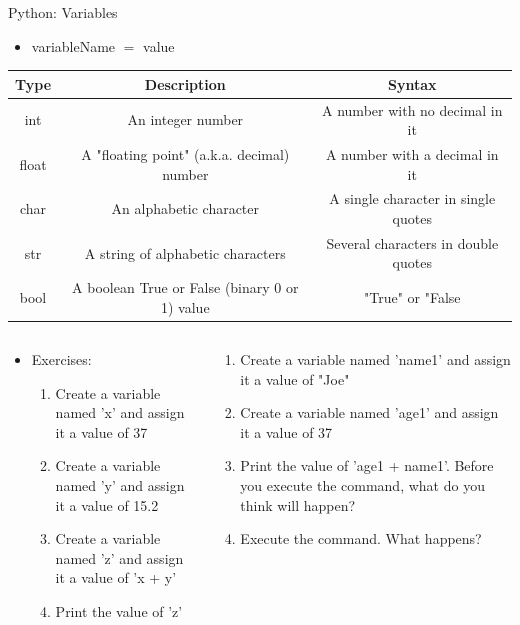 \documentclass[10pt, aspectratio=169]{beamer}
\begin{document}
\begin{frame}{Python: Variables}
    \begin{itemize}
        \item variableName $=$ value
    \end{itemize}

    \begin{center}
        \begin{tabular}{|c||c|c|}
            \hline
            Type & Description & Syntax \\
            \hline \hline
            int & An integer number & A number with no decimal in it\\
            \hline
            float & A "floating point" (a.k.a. decimal) number & A number with a decimal in it \\
            \hline
            char & An alphabetic character & A single character in single quotes\\
            \hline
            str & A string of alphabetic characters & Several characters in double quotes\\
            \hline
            bool & A boolean True or False (binary 0 or 1) value & "True" or "False\\
            \hline
        \end{tabular}
    \end{center}

    \begin{columns}
        \begin{column}{0.5\textwidth}
            \begin{itemize}
                \item Exercises:
                \begin{enumerate}
                    \item Create a variable named 'x' and assign it a value of 37
                    \item Create a variable named 'y' and assign it a value of 15.2
                    \item Create a variable named 'z' and assign it a value of 'x + y'
                    \item Print the value of 'z'
                \end{enumerate}
            \end{itemize}
        \end{column}
        \begin{column}{0.5\textwidth}
            \begin{enumerate}
                \item Create a variable named 'name1' and assign it a value of "Joe"
                \item Create a variable named 'age1' and assign it a value of 37
                \item Print the value of 'age1 + name1'. Before you execute the command, what do you think will happen?
                \item Execute the command. What happens?
            \end{enumerate}
        \end{column}
    \end{columns}
\end{frame}
\end{document}
